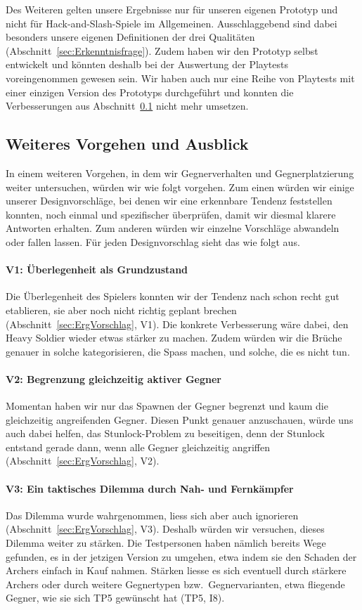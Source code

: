 \documentclass[../Main.tex]{subfiles}
\begin{document}
Des Weiteren gelten unsere Ergebnisse nur für unseren eigenen Prototyp und nicht für Hack-and-Slash-Spiele im Allgemeinen. Ausschlaggebend sind dabei besonders unsere eigenen Definitionen der drei Qualitäten (Abschnitt~\ref{sec:Erkenntnisfrage}). Zudem haben wir den Prototyp selbst entwickelt und könnten deshalb bei der Auswertung der Playtests voreingenommen gewesen sein. Wir haben auch nur eine Reihe von Playtests mit einer einzigen Version des Prototyps durchgeführt und konnten die Verbesserungen aus Abschnitt~\ref{sec:Verbesserungen} nicht mehr umsetzen.

\subsection{Weiteres Vorgehen und Ausblick} \label{sec:Verbesserungen}

In einem weiteren Vorgehen, in dem wir Gegnerverhalten und Gegnerplatzierung weiter untersuchen, würden wir wie folgt vorgehen. Zum einen würden wir einige unserer Designvorschläge, bei denen wir eine erkennbare Tendenz feststellen konnten, noch einmal und spezifischer überprüfen, damit wir diesmal klarere Antworten erhalten. Zum anderen würden wir einzelne Vorschläge abwandeln oder fallen lassen. Für jeden Designvorschlag sieht das wie folgt aus.

\paragraph{V1: Überlegenheit als Grundzustand}
Die Überlegenheit des Spielers konnten wir der Tendenz nach schon recht gut etablieren, sie aber noch nicht richtig geplant brechen (Abschnitt~\ref{sec:ErgVorschlag}, V1). Die konkrete Verbesserung wäre dabei, den Heavy Soldier wieder etwas stärker zu machen. Zudem würden wir die Brüche genauer in solche kategorisieren, die Spass machen, und solche, die es nicht tun.

\paragraph{V2: Begrenzung gleichzeitig aktiver Gegner}
Momentan haben wir nur das Spawnen der Gegner begrenzt und kaum die gleichzeitig angreifenden Gegner. Diesen Punkt genauer anzuschauen, würde uns auch dabei helfen, das Stunlock-Problem zu beseitigen, denn der Stunlock entstand gerade dann, wenn alle Gegner gleichzeitig angriffen (Abschnitt~\ref{sec:ErgVorschlag}, V2).

\paragraph{V3: Ein taktisches Dilemma durch Nah- und Fernkämpfer}
Das Dilemma wurde wahrgenommen, liess sich aber auch ignorieren (Abschnitt~\ref{sec:ErgVorschlag}, V3). Deshalb würden wir versuchen, dieses Dilemma weiter zu stärken. Die Testpersonen haben nämlich bereits Wege gefunden, es in der jetzigen Version zu umgehen, etwa indem sie den Schaden der Archers einfach in Kauf nahmen. Stärken liesse es sich eventuell durch stärkere Archers oder durch weitere Gegnertypen bzw.\ Gegnervarianten, etwa fliegende Gegner, wie sie sich TP5 gewünscht hat (TP5, I8).
\end{document}
